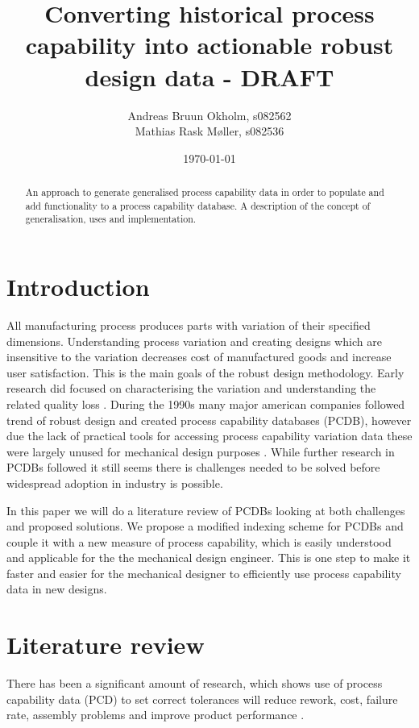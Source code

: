 \documentclass[aip,amsmath, preprint, author-year]{revtex4-1}
\begin{document}
\begin{abstract}
An approach to generate generalised process capability data in order to populate and add functionality to a process capability database.
A description of the concept of generalisation, uses and implementation.
\end{abstract}

\title{Converting historical process capability into actionable robust design data - DRAFT}
\author{Andreas Bruun Okholm, s082562\\
Mathias Rask Møller, s082536 }
 
\date{\today}
\maketitle


\section{Introduction}

All manufacturing process produces parts with variation of their specified dimensions.  
Understanding process variation and creating designs which are insensitive to the variation decreases cost of manufactured goods and increase user satisfaction. 
This is the main goals of the robust design methodology. 
Early research did focused on characterising the variation and understanding the related quality loss \cite{taguchi1986introduction}. 
During the 1990s many major american companies followed trend of robust design and created process capability databases (PCDB), however due the lack of practical tools for accessing process capability variation data these were largely unused for mechanical design purposes \cite{tata1999process}. 
While further research in PCDBs followed it still seems there is challenges needed to be solved before widespread adoption in industry is possible. 

In this paper we will do a literature review of PCDBs looking at both challenges and proposed solutions. 
We propose a modified indexing scheme for PCDBs and couple it with a new measure of process capability, which is easily understood and applicable for the the mechanical design engineer. 
This is one step to make it faster and easier for the mechanical designer to efficiently use process capability data in new designs. 

\section{Literature review}
There has been a significant amount of research, which shows use of process capability data (PCD) to set correct tolerances will reduce rework, cost, failure rate, assembly problems and improve product performance \citep{tata1999process}.
\end{document}
